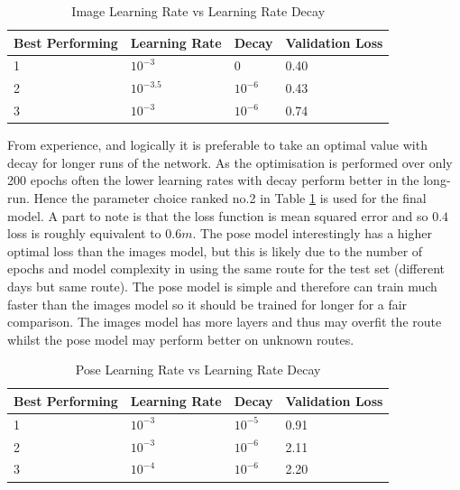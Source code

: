 \documentclass[11pt,twoside]{report}
\begin{document}
\noindent \begin{table}[h!]
	\centering
	\begin{tabular}{|p{3.0cm}|p{3.0cm}|p{3.0cm}|p{3.0cm}|}
		\hline
		\textbf{Best Performing}&\textbf{Learning Rate} & \textbf{Decay} &  \textbf{Validation Loss}       \\ \hline
		1  & $10^{-3}$   &   0 & 0.40     \\ \hline
		2  & $10^{-3.5}$   &   $10^{-6}$ & 0.43     \\ \hline
		3  & $10^{-3}$    &    $10^{-6}$ & 0.74   \\ \hline
		
	\end{tabular}
	\caption{Image Learning Rate vs Learning Rate Decay}
	\label{image_lr_lr_decay_table}
\end{table}

From experience, and logically it is preferable to take an optimal value with decay for longer runs of the network. As the optimisation is performed over only 200 epochs often the lower learning rates with decay perform better in the long-run. Hence the parameter choice ranked no.2 in Table \ref{image_lr_lr_decay_table} is used for the final model. A part to note is that the loss function is mean squared error and so $0.4$ loss is roughly equivalent to $0.6m$. The pose model interestingly has a higher optimal loss than the images model, but this is likely due to the number of epochs and model complexity in using the same route for the test set (different days but same route). The pose model is simple and therefore can train much faster than the images model so it should be trained for longer for a fair comparison. The images model has more layers and thus may overfit the route whilst the pose model may perform better on unknown routes.

\noindent \begin{table}[h!]
	\centering
	\begin{tabular}{|p{3.0cm}|p{3.0cm}|p{3.0cm}|p{3.0cm}|}
		\hline
		\textbf{Best Performing}&\textbf{Learning Rate} & \textbf{Decay} &  \textbf{Validation Loss}       \\ \hline
		1  & $10^{-3}$   &  $10^{-5}$ & 0.91     \\ \hline
		2  & $10^{-3}$   &   $10^{-6}$ & 2.11    \\ \hline
		3  & $10^{-4}$    &    $10^{-6}$ & 2.20   \\ \hline
		
	\end{tabular}
	\caption{Pose Learning Rate vs Learning Rate Decay}
	\label{pose_lr_lr_decay_table}
\end{table}
 
\end{document}
